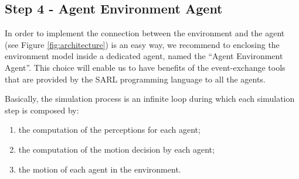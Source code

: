 \documentclass[english,nodocumentinfo,nopubpage]{utbmciadreport}
\begin{document}
\subsection{Step 4 - Agent Environment Agent}

In order to implement the connection between the environment and the agent (see Figure \ref{fig:architecture}) is an easy way, we recommend to enclosing the environment model inside a dedicated agent, named the ``Agent Environment Agent''. This choice will enable us to have benefits of the event-exchange tools that are provided by the SARL programming language to all the agents.

Basically, the simulation process is an infinite loop during which each simulation step is composed by:
\begin{enumerate}[1)]
\item the computation of the perceptions for each agent;
\item the computation of the motion decision by each agent;
\item the motion of each agent in the environment.
\end{enumerate}
\end{document}
